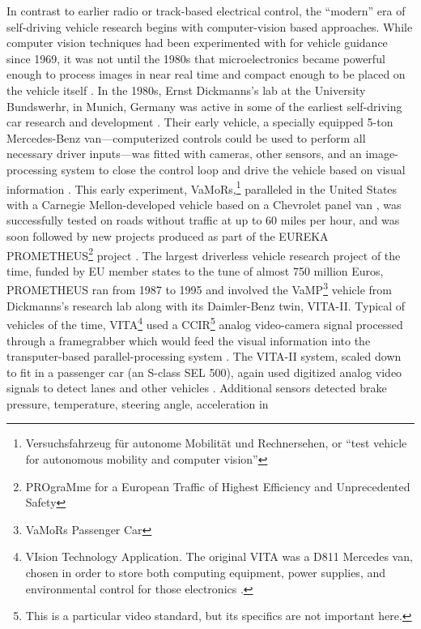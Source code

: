 In contrast to earlier radio or track-based electrical control, the
``modern'' era of self-driving vehicle research begins with
computer-vision based approaches. While computer vision techniques had
been experimented with for vehicle guidance since 1969, it was not
until the 1980s that microelectronics became powerful enough to
process images in near real time and compact enough to be placed on
the vehicle itself \cite[p. v]{dickmannsDynamic}. In the 1980s, Ernst
Dickmanns's lab at the 
University Bundswerhr, in Munich, Germany was active in some of the
earliest self-driving car research and development \cite{schmidhuber}. Their early
vehicle, a specially equipped 5-ton Mercedes-Benz van---computerized
controls could be used to perform all necessary driver inputs---was
fitted with cameras, other sensors, and an image-processing system to
close the control loop and drive the vehicle based on visual
information \cite{vamors-p}. This early experiment,
VaMoRs,\footnote{Versuchsfahrzeug f\"{u}r autonome Mobilit\"{a}t und
  Rechnersehen, or ``test vehicle for autonomous mobility and computer
  vision''} paralleled in the United  
States with a Carnegie Mellon-developed vehicle based on a Chevrolet
panel van \cite{bogostHist}, was successfully tested on roads without
traffic at up to 
60 miles per hour, and was soon followed by new projects produced as
part of the EUREKA PROMETHEUS\footnote{PROgraMme for a European
  Traffic of Highest Efficiency and Unprecedented Safety} project \cite{eureka}. The largest driverless vehicle
research project of the time, funded by EU member states to the tune
of almost 750 million Euros, PROMETHEUS ran from 1987 to 1995 and
involved the VaMP\footnote{VaMoRs Passenger Car} vehicle from
Dickmanns's research lab along with its 
Daimler-Benz twin, VITA-II. Typical of vehicles of the time,
VITA\footnote{VIsion Technology Application. The original VITA was a
  D811 Mercedes van, chosen in order to store both computing
  equipment, power supplies, and environmental control for those
  electronics \cite[p. 37]{ulmerVITA}.} used
a CCIR\footnote{This is a particular video standard, but its specifics are
  not important here.} analog video-camera signal processed through a framegrabber
which would feed the visual information into the transputer-based
parallel-processing system \cite[p. 38]{ulmerVITA}. The VITA-II
system, scaled down to fit in 
a passenger car (an S-class SEL 500), again used digitized analog
video signals to detect lanes and other vehicles \cite[p.
  2]{ulmerVITA-II}. Additional sensors 
detected brake pressure, temperature, steering angle, acceleration in
